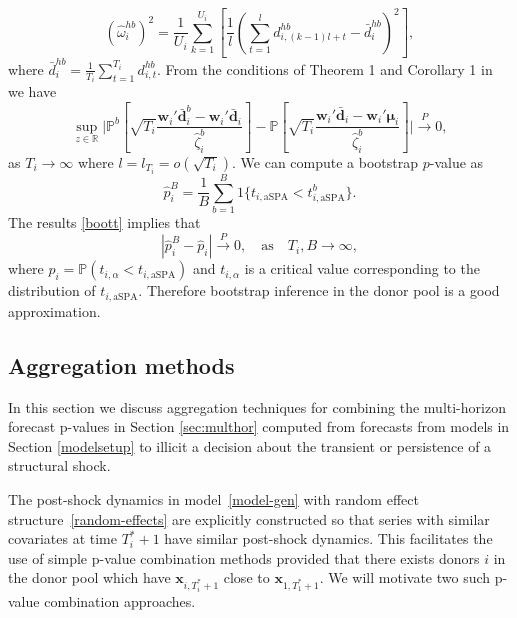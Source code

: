\documentclass[11pt]{article}
\newcommand{\R}{\mathbb{R}}
\newcommand{\x}{\textbf{x}}
\newcommand{\dbf}{\textbf{d}}
\newcommand{\Prob}{\mathbb{P}}
\def\mbf#1{\mathbf{#1}} %
\theoremstyle{definition}
\begin{document}
\begin{equation} \label{whb}
	\left(\hat{\omega}_{i}^{hb}\right)^2 = \frac{1}{U_i}\sum_{k=1}^{U_i}\left[\frac{1}{l}\left(\sum_{t=1}^l d^{hb}_{i,(k-1)l + t} - \bar{d}^{hb}_{i}\right)^2\right],
\end{equation}
where $\bar{d}^{hb}_{i} = \frac{1}{T_i}\sum_{t=1}^{T_i} d^{hb}_{i,t}$. From the conditions of Theorem 1 and Corollary 1 in \cite{quaedvlieg2021multi}  we have 
\begin{equation} \label{boott}
  \sup_{z\in\R}\Big\vert \Prob^b\left[\sqrt{T_i}\frac{\textbf{w}_i'\bar{\dbf}^b_{i} - \textbf{w}_i'\bar{\dbf}_{i} }{\hat{\zeta}^b_{i}}\right] 
  - \Prob\left[\sqrt{T_i}\frac{\textbf{w}_i'\bar{\dbf}_{i} -  \textbf{w}_i'\mbf{\mu}_{i}}{\hat{\zeta}^b_{i}}\right]
  \Big\vert \overset{P}{\longrightarrow} 0,
\end{equation}
as $T_i\to\infty$ where $l=l_{T_i}=o(\sqrt{T_i})$. We can compute a bootstrap $p$-value as 
\begin{equation} \label{bootp}
  \hat{p}_i^B = \frac{1}{B}\sum_{b=1}^B 1\{t_{i,\text{aSPA}} < t^b_{i,\text{aSPA}}\}. 
\end{equation}
The results \eqref{boott} implies that 
$$
  |\hat p_i^B - \hat p_i| \overset{P}{\to} 0, \quad \text{as} \quad T_i,B \to \infty, 
$$
where $\hat p_i = \Prob(t_{i,\alpha} < t_{i,\text{aSPA}})$ and $t_{i,\alpha}$ is a critical value corresponding to the distribution of $t_{i,\text{aSPA}}$. Therefore bootstrap inference in the donor pool is a good approximation. %






\subsection{Aggregation methods}
\label{sec:aggmeth}

In this section we discuss aggregation techniques for combining the multi-horizon forecast p-values in Section \ref{sec:multhor} computed from forecasts from models in Section \ref{modelsetup} to illicit a decision about the transient or persistence of a structural shock. 

The post-shock dynamics in model~\eqref{model-gen} with random effect structure~\eqref{random-effects} are explicitly constructed so that series with similar covariates at time $T^*_i + 1$ have similar post-shock dynamics. This facilitates the use of simple p-value combination methods provided that there exists donors $i$ in the donor pool which have $\x_{i,T^*_i+1}$ close to $\x_{1,T^*_1+1}$. We will motivate two such p-value combination approaches. 
\end{document}
